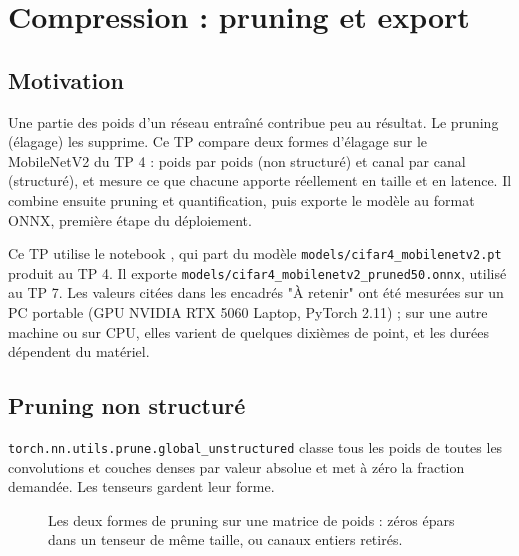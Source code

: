 
\chapter{Compression : pruning et export}

\section*{Motivation}

Une partie des poids d'un réseau entraîné contribue peu au résultat. Le pruning (élagage) les supprime. Ce TP compare deux formes d'élagage sur le MobileNetV2 du TP 4 : poids par poids (non structuré) et canal par canal (structuré), et mesure ce que chacune apporte réellement en taille et en latence. Il combine ensuite pruning et quantification, puis exporte le modèle au format ONNX, première étape du déploiement. \\

\begin{imp}
Ce TP utilise le notebook , qui part du modèle \texttt{models/cifar4\_mobilenetv2.pt} produit au TP 4. Il exporte \texttt{models/cifar4\_mobilenetv2\_pruned50.onnx}, utilisé au TP 7.
Les valeurs citées dans les encadrés "À retenir" ont été mesurées sur un PC portable (GPU NVIDIA RTX 5060 Laptop, PyTorch 2.11) ; sur une autre machine ou sur CPU, elles varient de quelques dixièmes de point, et les durées dépendent du matériel.
\end{imp}

\section{Pruning non structuré}

\texttt{torch.nn.utils.prune.global\_unstructured} classe tous les poids de toutes les convolutions et couches denses par valeur absolue et met à zéro la fraction demandée. Les tenseurs gardent leur forme.

\begin{figure}[H]
\centering
\resizebox{0.6\linewidth}{!}{}
\caption{Les deux formes de pruning sur une matrice de poids : zéros épars dans un tenseur de même taille, ou canaux entiers retirés.}
\label{fig:tp6-kinds}
\end{figure}

